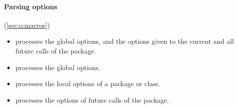 \paragraph{Parsing options} (\autoref{sec:o:macros})
\begin{itemize}
  \item {}
    processes the global options, and the options given to the current and
    all future calls of the package.
  \item {}
    processes the global options.
  \item {}
    processes the local options of a package or class.
  \item {}
    processes the options of future calls of the package.
\end{itemize}
